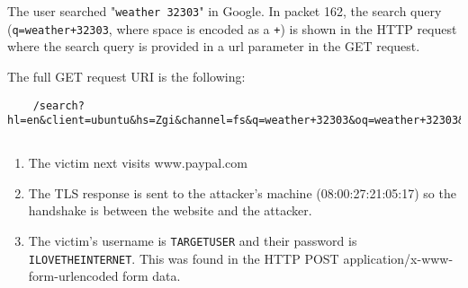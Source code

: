 \documentclass[12pt]{exam}
\begin{document}
The user searched "\lstinline{weather 32303}" in Google.  In packet 162, the
search query (\lstinline{q=weather+32303}, where space is encoded as a
\lstinline{+}) is shown in the HTTP request where the search query is provided
in a url parameter in the GET request.

The full GET request URI is the following:

\begin{lstlisting}
    /search?hl=en&client=ubuntu&hs=Zgi&channel=fs&q=weather+32303&oq=weather+32303&gs_l=serp.3..0l2j0i30l2j0i5i30l3j0i8j0i8i30l2.44912.47718.0.48648.15.9.1.5.5.0.118.808.7j2.9.0.les%3B..0.0...1c.1.4.serp.hEw2INguST0
\end{lstlisting}

\subsection{}

\begin{enumerate}[label=\alph*)]
    \item The victim next visits www.paypal.com
    \item The TLS response is sent to the attacker's machine (08:00:27:21:05:17)
    so the handshake is between the website and the attacker.
    \item The victim's username is \lstinline{TARGETUSER} and their password is
    \lstinline{ILOVETHEINTERNET}.  This was found in the HTTP POST
    application/x-www-form-urlencoded form data.  
\end{enumerate}
\end{document}
